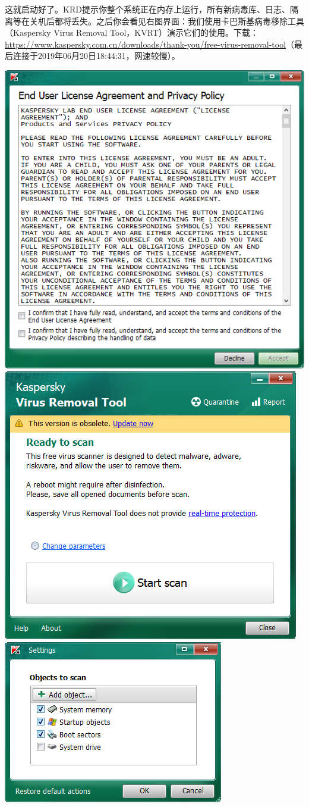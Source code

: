 这就启动好了。KRD提示你整个系统正在内存上运行，所有新病毒库、日志、隔离等在关机后都将丢失。之后你会看见右图界面：我们使用卡巴斯基病毒移除工具（Kaspersky Virus Removal Tool，KVRT）演示它们的使用。下载：\url{https://www.kaspersky.com.cn/downloads/thank-you/free-virus-removal-tool}（最后连接于2019年06月20日18:44:31，网速较慢）。
\begin{center}
	\includegraphics[width=0.7\linewidth]{pic/kvrt_eula.PNG}        \includegraphics[width=0.7\linewidth]{pic/kvrt_ready.PNG}\\
	\includegraphics[width=0.7\linewidth]{pic/kvrt_conf.PNG}

\end{center}

